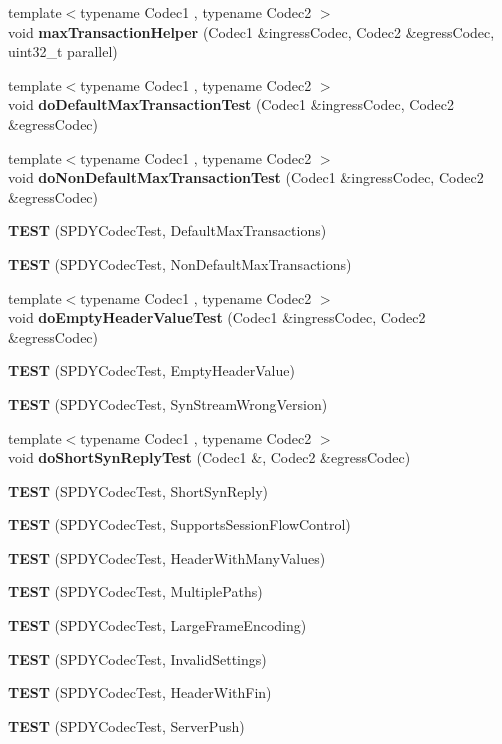 \begin{DoxyCompactItemize}
\item 
{\footnotesize template$<$typename Codec1 , typename Codec2 $>$ }\\void {\bf max\+Transaction\+Helper} (Codec1 \&ingress\+Codec, Codec2 \&egress\+Codec, uint32\+\_\+t parallel)
\item 
{\footnotesize template$<$typename Codec1 , typename Codec2 $>$ }\\void {\bf do\+Default\+Max\+Transaction\+Test} (Codec1 \&ingress\+Codec, Codec2 \&egress\+Codec)
\item 
{\footnotesize template$<$typename Codec1 , typename Codec2 $>$ }\\void {\bf do\+Non\+Default\+Max\+Transaction\+Test} (Codec1 \&ingress\+Codec, Codec2 \&egress\+Codec)
\item 
{\bf T\+E\+ST} (S\+P\+D\+Y\+Codec\+Test, Default\+Max\+Transactions)
\item 
{\bf T\+E\+ST} (S\+P\+D\+Y\+Codec\+Test, Non\+Default\+Max\+Transactions)
\item 
{\footnotesize template$<$typename Codec1 , typename Codec2 $>$ }\\void {\bf do\+Empty\+Header\+Value\+Test} (Codec1 \&ingress\+Codec, Codec2 \&egress\+Codec)
\item 
{\bf T\+E\+ST} (S\+P\+D\+Y\+Codec\+Test, Empty\+Header\+Value)
\item 
{\bf T\+E\+ST} (S\+P\+D\+Y\+Codec\+Test, Syn\+Stream\+Wrong\+Version)
\item 
{\footnotesize template$<$typename Codec1 , typename Codec2 $>$ }\\void {\bf do\+Short\+Syn\+Reply\+Test} (Codec1 \&, Codec2 \&egress\+Codec)
\item 
{\bf T\+E\+ST} (S\+P\+D\+Y\+Codec\+Test, Short\+Syn\+Reply)
\item 
{\bf T\+E\+ST} (S\+P\+D\+Y\+Codec\+Test, Supports\+Session\+Flow\+Control)
\item 
{\bf T\+E\+ST} (S\+P\+D\+Y\+Codec\+Test, Header\+With\+Many\+Values)
\item 
{\bf T\+E\+ST} (S\+P\+D\+Y\+Codec\+Test, Multiple\+Paths)
\item 
{\bf T\+E\+ST} (S\+P\+D\+Y\+Codec\+Test, Large\+Frame\+Encoding)
\item 
{\bf T\+E\+ST} (S\+P\+D\+Y\+Codec\+Test, Invalid\+Settings)
\item 
{\bf T\+E\+ST} (S\+P\+D\+Y\+Codec\+Test, Header\+With\+Fin)
\item 
{\bf T\+E\+ST} (S\+P\+D\+Y\+Codec\+Test, Server\+Push)
\item 

\end{DoxyCompactItemize}
